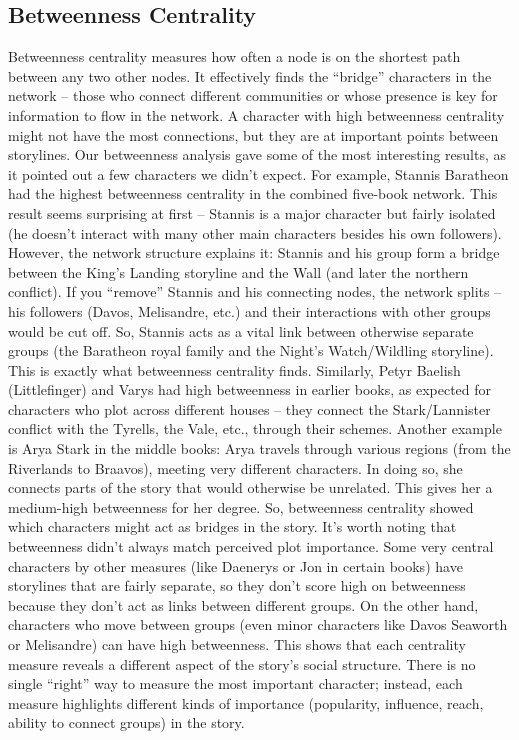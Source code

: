 \documentclass[12pt, a4paper]{article}
\begin{document}
\subsection*{Betweenness Centrality}
Betweenness centrality measures how often a node is on the shortest path between any two other nodes. It effectively finds the ``bridge'' characters in the network – those who connect different communities or whose presence is key for information to flow in the network. A character with high betweenness centrality might not have the most connections, but they are at important points between storylines. Our betweenness analysis gave some of the most interesting results, as it pointed out a few characters we didn't expect. For example, Stannis Baratheon had the highest betweenness centrality in the combined five-book network. This result seems surprising at first – Stannis is a major character but fairly isolated (he doesn't interact with many other main characters besides his own followers). However, the network structure explains it: Stannis and his group form a bridge between the King's Landing storyline and the Wall (and later the northern conflict). If you ``remove'' Stannis and his connecting nodes, the network splits – his followers (Davos, Melisandre, etc.) and their interactions with other groups would be cut off. So, Stannis acts as a vital link between otherwise separate groups (the Baratheon royal family and the Night's Watch/Wildling storyline). This is exactly what betweenness centrality finds. Similarly, Petyr Baelish (Littlefinger) and Varys had high betweenness in earlier books, as expected for characters who plot across different houses – they connect the Stark/Lannister conflict with the Tyrells, the Vale, etc., through their schemes. Another example is Arya Stark in the middle books: Arya travels through various regions (from the Riverlands to Braavos), meeting very different characters. In doing so, she connects parts of the story that would otherwise be unrelated. This gives her a medium-high betweenness for her degree. So, betweenness centrality showed which characters might act as bridges in the story. It's worth noting that betweenness didn't always match perceived plot importance. Some very central characters by other measures (like Daenerys or Jon in certain books) have storylines that are fairly separate, so they don't score high on betweenness because they don't act as links between different groups. On the other hand, characters who move between groups (even minor characters like Davos Seaworth or Melisandre) can have high betweenness. This shows that each centrality measure reveals a different aspect of the story's social structure. There is no single ``right'' way to measure the most important character; instead, each measure highlights different kinds of importance (popularity, influence, reach, ability to connect groups) in the story.
\end{document}

